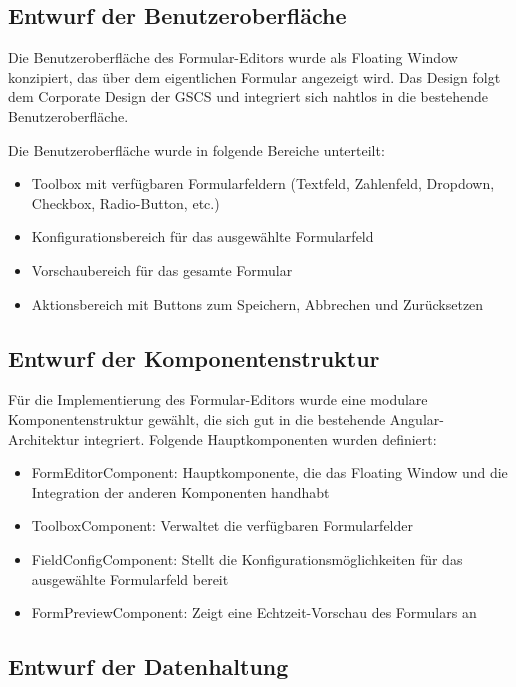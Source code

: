 \documentclass[a4paper,11pt]{article}
\begin{document}
\subsection{Entwurf der Benutzeroberfläche}

Die Benutzeroberfläche des Formular-Editors wurde als Floating Window konzipiert, das über dem eigentlichen Formular angezeigt wird. Das Design folgt dem Corporate Design der GSCS und integriert sich nahtlos in die bestehende Benutzeroberfläche.

Die Benutzeroberfläche wurde in folgende Bereiche unterteilt:

\begin{itemize}
\item Toolbox mit verfügbaren Formularfeldern (Textfeld, Zahlenfeld, Dropdown, Checkbox, Radio-Button, etc.)
\item Konfigurationsbereich für das ausgewählte Formularfeld
\item Vorschaubereich für das gesamte Formular
\item Aktionsbereich mit Buttons zum Speichern, Abbrechen und Zurücksetzen
\end{itemize}

\subsection{Entwurf der Komponentenstruktur}

Für die Implementierung des Formular-Editors wurde eine modulare Komponentenstruktur gewählt, die sich gut in die bestehende Angular-Architektur integriert. Folgende Hauptkomponenten wurden definiert:

\begin{itemize}
\item FormEditorComponent: Hauptkomponente, die das Floating Window und die Integration der anderen Komponenten handhabt
\item ToolboxComponent: Verwaltet die verfügbaren Formularfelder
\item FieldConfigComponent: Stellt die Konfigurationsmöglichkeiten für das ausgewählte Formularfeld bereit
\item FormPreviewComponent: Zeigt eine Echtzeit-Vorschau des Formulars an
\end{itemize}

\subsection{Entwurf der Datenhaltung}
\end{document}
